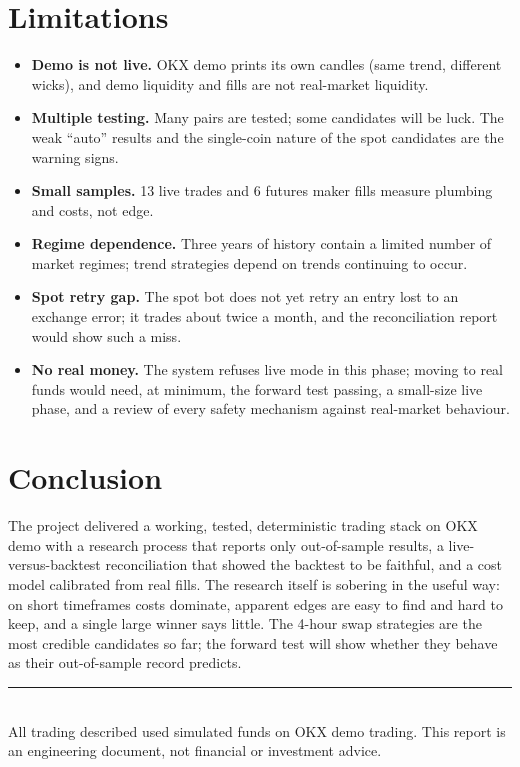 \documentclass[11pt,a4paper]{article}
\begin{document}
\section{Limitations}
\begin{itemize}
\item \textbf{Demo is not live.} OKX demo prints its own candles (same trend, different wicks),
and demo liquidity and fills are not real-market liquidity.
\item \textbf{Multiple testing.} Many pairs are tested; some candidates will be luck. The weak
``auto'' results and the single-coin nature of the spot candidates are the warning signs.
\item \textbf{Small samples.} 13 live trades and 6 futures maker fills measure plumbing and costs,
not edge.
\item \textbf{Regime dependence.} Three years of history contain a limited number of market
regimes; trend strategies depend on trends continuing to occur.
\item \textbf{Spot retry gap.} The spot bot does not yet retry an entry lost to an exchange error;
it trades about twice a month, and the reconciliation report would show such a miss.
\item \textbf{No real money.} The system refuses live mode in this phase; moving to real funds
would need, at minimum, the forward test passing, a small-size live phase, and a review of every
safety mechanism against real-market behaviour.
\end{itemize}

\section{Conclusion}
The project delivered a working, tested, deterministic trading stack on OKX demo with a research
process that reports only out-of-sample results, a live-versus-backtest reconciliation that
showed the backtest to be faithful, and a cost model calibrated from real fills. The research
itself is sobering in the useful way: on short timeframes costs dominate, apparent edges are easy
to find and hard to keep, and a single large winner says little. The 4-hour swap strategies are
the most credible candidates so far; the forward test will show whether they behave as their
out-of-sample record predicts.

\vfill
\noindent\rule{\linewidth}{0.4pt}\\
\footnotesize All trading described used simulated funds on OKX demo trading. This report is an
engineering document, not financial or investment advice.
\end{document}
